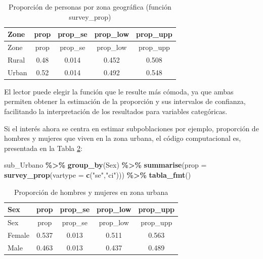 \documentclass[
  spanish,
  12pt,
]{book}
\newenvironment{Shaded}{\begin{snugshade}}{\end{snugshade}}
\newcommand{\AttributeTok}[1]{\textcolor[rgb]{0.13,0.29,0.53}{#1}}
\newcommand{\FunctionTok}[1]{\textcolor[rgb]{0.13,0.29,0.53}{\textbf{#1}}}
\newcommand{\NormalTok}[1]{#1}
\newcommand{\SpecialCharTok}[1]{\textcolor[rgb]{0.81,0.36,0.00}{\textbf{#1}}}
\newcommand{\StringTok}[1]{\textcolor[rgb]{0.31,0.60,0.02}{#1}}
\begin{document}
\begin{longtable}[]{@{}lcccc@{}}
\caption{\label{tab:tab-prop-zona2}Proporción de personas por zona geográfica (función survey\_prop)}\tabularnewline
\toprule\noalign{}
Zone & prop & prop\_se & prop\_low & prop\_upp \\
\midrule\noalign{}
\endfirsthead
\toprule\noalign{}
Zone & prop & prop\_se & prop\_low & prop\_upp \\
\midrule\noalign{}
\endhead
\bottomrule\noalign{}
\endlastfoot
Rural & 0.48 & 0.014 & 0.452 & 0.508 \\
Urban & 0.52 & 0.014 & 0.492 & 0.548 \\
\end{longtable}

El lector puede elegir la función que le resulte más cómoda, ya que ambas permiten obtener la estimación de la proporción y sus intervalos de confianza, facilitando la interpretación de los resultados para variables categóricas.

Si el interés ahora se centra en estimar subpoblaciones por ejemplo, proporción de hombres y mujeres que viven en la zona urbana, el código computacional es, presentada en la Tabla \ref{tab:tab-prop-sexo-urbano}:

\begin{Shaded}
\begin{Highlighting}[]
\NormalTok{sub\_Urbano }\SpecialCharTok{\%\textgreater{}\%} 
  \FunctionTok{group\_by}\NormalTok{(Sex) }\SpecialCharTok{\%\textgreater{}\%} 
  \FunctionTok{summarise}\NormalTok{(}\AttributeTok{prop =} \FunctionTok{survey\_prop}\NormalTok{(}\AttributeTok{vartype =} \FunctionTok{c}\NormalTok{(}\StringTok{"se"}\NormalTok{,}\StringTok{"ci"}\NormalTok{))) }\SpecialCharTok{\%\textgreater{}\%}
  \FunctionTok{tabla\_fmt}\NormalTok{()}
\end{Highlighting}
\end{Shaded}

\begin{longtable}[]{@{}lcccc@{}}
\caption{\label{tab:tab-prop-sexo-urbano}Proporción de hombres y mujeres en zona urbana}\tabularnewline
\toprule\noalign{}
Sex & prop & prop\_se & prop\_low & prop\_upp \\
\midrule\noalign{}
\endfirsthead
\toprule\noalign{}
Sex & prop & prop\_se & prop\_low & prop\_upp \\
\midrule\noalign{}
\endhead
\bottomrule\noalign{}
\endlastfoot
Female & 0.537 & 0.013 & 0.511 & 0.563 \\
Male & 0.463 & 0.013 & 0.437 & 0.489 \\
\end{longtable}
\end{document}
